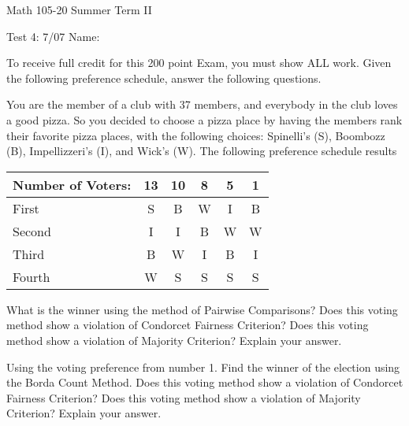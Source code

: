 \documentclass[11pt,epsfig]{article}
\begin{document}
Math 105-20 Summer Term II 

Test 4: 7/07 \hspace{1.9in} {Name:} {\underline {\hspace{3.5in}}}
\vspace{2pc}

To receive full credit for this 200 point Exam, you must show ALL work. Given the following preference schedule, answer the following questions.
\vspace{0.5pc}

   
\begin{problem}{25}
You are the member of a club with 37 members, and everybody in the club loves a good pizza. So you decided to choose a pizza place by having the members rank their favorite pizza places, with the following choices: Spinelli’s (S), Boombozz (B), Impellizzeri’s (I), and Wick’s (W). The following preference schedule results


 \begin{center}
 \begin{tabular}{ | l | c | c  |  c |  c | c |}
   \hline
   Number of Voters: & 13 & 10 & 8 & 5 & 1\\ \hline
   First & S & B & W & I & B \\ \hline
   Second & I & I & B & W & W \\ \hline
   Third & B & W & I & B & I \\ \hline
   Fourth & W & S & S & S & S \\ \hline
   \end{tabular}
  \end{center}
What is the winner using the method of Pairwise Comparisons? Does this voting method show a violation of Condorcet Fairness Criterion? Does this voting method show a violation of Majority Criterion? Explain your answer. 


\vfill
\end{problem}


\begin{problem}{25}
Using the voting preference from number 1. Find the winner of the election using the Borda Count Method. Does this voting method show a violation of Condorcet Fairness Criterion? Does this voting method show a violation of Majority Criterion? Explain your answer.
\vfill
\end{problem}
\end{document}
